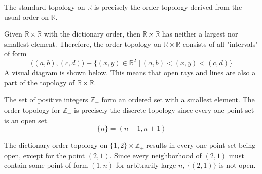     \begin{example}
      The standard topology on $\mathbb{R}$ is precisely the order topology derived from the usual order on $\mathbb{R}$. 
    \end{example}

    \begin{example}
      Given $\mathbb{R} \times \mathbb{R}$ with the dictionary order, then $\mathbb{R} \times \mathbb{R}$ has neither a largest nor smallest element. Therefore, the order topology on $\mathbb{R} \times \mathbb{R}$ consists of all "intervals" of form
      \[\big((a, b), (c, d) \big) \equiv  \{(x, y) \in \mathbb{R}^2 \; | \; (a, b) < (x, y) < (c, d)\}\]
      A visual diagram is shown below. This means that open rays and lines are also a part of the topology of $\mathbb{R} \times \mathbb{R}$. 

      \begin{center}
      \end{center}
    \end{example}

    \begin{example}
      The set of positive integers $\mathbb{Z}_+$ form an ordered set with a smallest element. The order topology for $\mathbb{Z}_+$ is precisely the discrete topology since every one-point set is an open set. 
      \begin{equation}
        \{n\} = (n-1, n+1)
      \end{equation}
    \end{example}

    \begin{example}
      The dictionary order topology on $\{1, 2\} \times \mathbb{Z}_+$ results in every one point set being open, except for the point $(2, 1)$. Since every neighborhood of $(2,1)$ must contain some point of form $(1, n)$ for arbitrarily large $n$, $\{(2,1)\}$ is not open. 
    \end{example}

